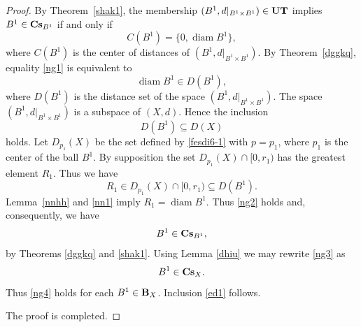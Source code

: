 \documentclass[10pt,a4paper]{amsart}
\begin{document}
\begin{proof}
By Theorem~\ref{shak1}, the membership
\((B^{1},d|_{B^{1}\times B^{1}})\in {\bf UT}
\)
implies  \(B^{1}\in  {\bf Cs}_{B^1}\)  if and only if
\begin{equation}
    \label{ng1}
C(B^{1})=\{0,\operatorname{diam} B^{1}\},
\end{equation}
where $C(B^1)$ is the center of distances of $(B^1, d|_{B^1\times B^1})$.
By Theorem~\ref{dggkq}, equality \eqref{ng1} is equivalent to 
\begin{equation}
\label{ng2}
\operatorname{diam} B^{1} \in D(B^{1}),
\end{equation}
where \(D(B^{1})\) is the distance set of the space \((B^{1},d|_{B^{1}\times B^{1}})\).
The space \((B^{1},d|_{B^{1}\times B^{1}})\) is a subspace of \((X,d)\).
Hence the inclusion
\[
D(B^{1}) \subseteq D(X)
\]
holds. Let $D_{p_1}(X)$ be the set defined by \eqref{fesdi6-1} with $p=p_1$, where $p_1$ is the center of the ball $B^1$. By supposition the set $D_{p_1}(X)\cap [0,r_1)$  has the greatest element $R_1$. Thus we have 
\begin{equation*}
    R_1\in D_{p_1} (X)\cap [0,r_1) \subseteq D(B^1).
\end{equation*}
Lemma~\ref{nnhh} and \eqref{nn1} imply $R_1=\operatorname{diam}B^1$.
  Thus \eqref{ng2} holds and, consequently, we have
\begin{equation}
    \label{ng3}
 B^1\in {\bf Cs}_{B^{1}},
\end{equation}
by Theorems \ref{dggkq} and \ref{shak1}.
Using Lemma \ref{dhiu} we may rewrite \eqref{ng3} as
\begin{equation}
    \label{ng4}
B^1 \in {\bf Cs}_X. 
\end{equation}
Thus \eqref{ng4} holds for each \(B^{1}\in {\bf B}_X\).
Inclusion \eqref{ed1} follows.

The proof is completed.
\end{proof}
\end{document}
